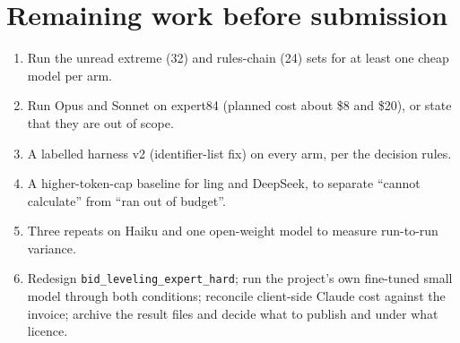 \documentclass[11pt]{article}
\begin{document}
\section*{Remaining work before submission}
\begin{enumerate}[leftmargin=*]
\item Run the unread extreme (32) and rules-chain (24) sets for at least one cheap model per arm.
\item Run Opus and Sonnet on expert84 (planned cost about \$8 and \$20), or state that they are out of scope.
\item A labelled harness v2 (identifier-list fix) on every arm, per the decision rules.
\item A higher-token-cap baseline for ling and DeepSeek, to separate ``cannot calculate'' from ``ran out of budget''.
\item Three repeats on Haiku and one open-weight model to measure run-to-run variance.
\item Redesign \texttt{bid\_leveling\_expert\_hard}; run the project's own fine-tuned small model through both conditions; reconcile client-side Claude cost against the invoice; archive the result files and decide what to publish and under what licence.
\end{enumerate}
\end{document}
